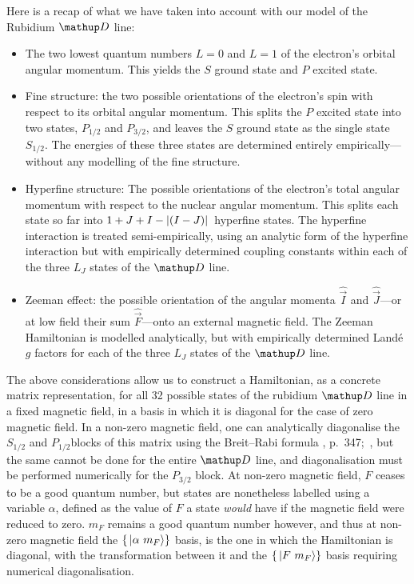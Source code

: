 Here is a recap of what we have taken into account with our model of the Rubidium $\up{D}$ line:
\begin{itemize}
    \item The two lowest quantum numbers $L=0$ and $L=1$ of the electron's orbital angular momentum. This yields the $S$ ground state and $P$ excited state.
    \item Fine structure: the two possible orientations of the electron's spin with respect to its orbital angular momentum. This splits the $P$ excited state into two states, $P_{1/2}$ and $P_{3/2}$, and leaves the $S$ ground state as the single state $S_{1/2}$. The energies of these three states are determined entirely empirically---without any modelling of the fine structure.
    \item Hyperfine structure: The possible orientations of the electron's total angular momentum with respect to the nuclear angular momentum. This splits each state so far into $1+J+I - \abs{(I - J)}$ hyperfine states. The hyperfine interaction is treated semi-empirically, using an analytic form of the hyperfine interaction but with empirically determined coupling constants within each of the three $L_J$ states of the $\up{D}$ line. 
    \item Zeeman effect: the possible orientation of the angular momenta $\hat{\vec I}$ and $\hat{\vec J}$---or at low field their sum $\hat{\vec F}$---onto an external magnetic field. The Zeeman Hamiltonian is modelled analytically, but with empirically determined Land\'e $g$ factors for each of the three $L_J$ states of the $\up{D}$ line. 
\end{itemize}

The above considerations allow us to construct a Hamiltonian, as a concrete matrix representation, for all 32 possible states of the rubidium $\up{D}$ line in a fixed magnetic field, in a basis in which it is diagonal for the case of zero magnetic field. In a non-zero magnetic field, one can analytically diagonalise the $S_{1/2}$ and $P_{1/2}$blocks of this matrix using the Breit--Rabi formula
\citeleft{}, p.~347;~\citeright, but the same cannot be done for the entire $\up{D}$ line, and diagonalisation must be performed numerically for the $P_{3/2}$ block. At non-zero magnetic field, $F$ ceases to be a good quantum number, but states are nonetheless labelled using a variable $\alpha$, defined as the value of $F$ a state \emph{would} have if the magnetic field were reduced to zero. $m_F$ remains a good quantum number however, and thus at non-zero magnetic field the $\{\ket{\alpha\ m_F}\}$ basis, is the one in which the Hamiltonian is diagonal, with the transformation between it and the $\{\ket{F\ m_F}\}$ basis requiring numerical diagonalisation.


